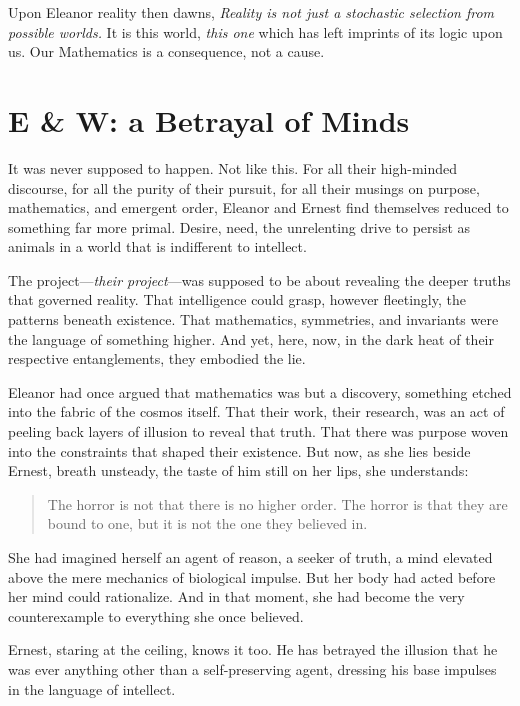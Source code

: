 \smallskip

Upon Eleanor reality then dawns, \textit{Reality is not just a stochastic selection from possible worlds.}  
It is this world, \textit{this one} which has left imprints of its logic upon us. Our Mathematics is a consequence, not a cause. 


\section*{E \& W: a Betrayal of Minds}

It was never supposed to happen. Not like this. For all their high-minded discourse, for all the purity of their pursuit, for all their musings on purpose, mathematics, and emergent order, Eleanor and Ernest find themselves reduced to something far more primal. Desire, need, the unrelenting drive to persist as animals in a world that is indifferent to intellect.

The project—\textit{their project}—was supposed to be about revealing the deeper truths that governed reality. That intelligence could grasp, however fleetingly, the patterns beneath existence. That mathematics, symmetries, and invariants were the language of something higher. And yet, here, now, in the dark heat of their respective entanglements, they embodied the lie.

\smallskip

Eleanor had once argued that mathematics was  but a discovery, something etched into the fabric of the cosmos itself. That their work, their research, was an act of peeling back layers of illusion to reveal that truth. That there was purpose woven into the constraints that shaped their existence. But now, as she lies beside Ernest, breath unsteady, the taste of him still on her lips, she understands:  

\begin{quote}
The horror is not that there is no higher order. The horror is that they are bound to one, but it is not the one they believed in.  
\end{quote}

She had imagined herself an agent of reason, a seeker of truth, a mind elevated above the mere mechanics of biological impulse. But her body had acted before her mind could rationalize. And in that moment, she had become the very counterexample to everything she once believed.

\smallskip

Ernest, staring at the ceiling, knows it too. He has betrayed the illusion that he was ever anything other than a self-preserving agent, dressing his base impulses in the language of intellect. 

